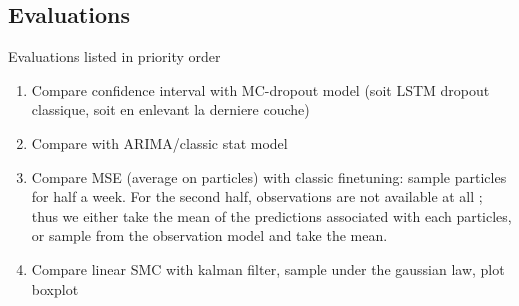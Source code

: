 \documentclass{article}
\begin{document}
\subsection{Evaluations}%
\label{sub:evaluations}

Evaluations listed in priority order
\begin{enumerate}
	\item Compare confidence interval with MC-dropout model (soit LSTM dropout classique, soit en enlevant la derniere couche)
	\item Compare with ARIMA/classic stat model
	\item Compare MSE (average on particles) with classic finetuning: sample particles for half a week. For the second half, observations are not available at all ; thus we either take the mean of the predictions associated with each particles, or sample from the observation model and take the mean.
	\item Compare linear SMC with kalman filter, sample under the gaussian law, plot boxplot
\end{enumerate}








\end{document}
